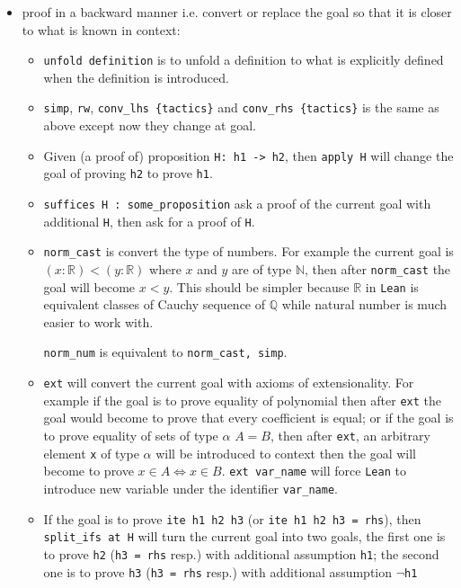 \documentclass{report}
\theoremstyle{definition}
\begin{document}
\begin{itemize}
  \item proof in a backward manner i.e. convert or replace the goal so that it is closer to what is known in context:
  \begin{itemize}
    \item {\tt \small unfold definition} is to unfold a definition to what is explicitly defined when the definition is introduced.
    \item {\tt \small simp}, {\tt \small rw}, {\tt \small conv\_lhs \{tactics\}} and {\tt \small conv\_rhs \{tactics\}} is the same as above except now they change at goal.
    \item Given (a proof of) proposition {\tt \small H: h1 -> h2}, then {\tt \small apply H} will change the goal of proving {\tt \small h2} to prove {\tt \small h1}.
    \item {\tt \small suffices H : some\_proposition} ask a proof of the current goal with additional {\tt \small H}, then ask for a proof of {\tt \small H}.
    \item {\tt \small norm\_cast} is convert the type of numbers. For example the current goal is $(x:\mathbb R)<(y:\mathbb R)$ where $x$ and $y$ are of type $\mathbb N$, then after {\tt \small norm\_cast} the goal will become $x<y$. This should be simpler because $\mathbb R$ in {\tt \small Lean} is equivalent classes of Cauchy sequence of $\mathbb Q$ while natural number is much easier to work with.
    
    {\tt \small norm\_num} is equivalent to {\tt \small norm\_cast, simp}.

    \item {\tt \small ext} will convert the current goal with axioms of extensionality. For example if the goal is to prove equality of polynomial then after {\tt \small ext} the goal would become to prove that every coefficient is equal; or if the goal is to prove equality of sets of type $\alpha$ $A=B$, then after {\tt \small ext}, an arbitrary element {\tt \small x} of type $\alpha$ will be introduced to context then the goal will become to prove $x\in A\iff x\in B$. {\tt \small ext var\_name} will force {\tt \small Lean} to introduce new variable under the identifier {\tt \small var\_name}.
    \item If the goal is to prove {\tt \small ite h1 h2 h3} (or {\tt \small ite h1 h2 h3 = rhs}), then {\tt \small split\_ifs at H} will turn the current goal into two goals, the first one is to prove {\tt \small h2} ({\tt \small h3 = rhs} resp.) with additional assumption {\tt \small h1}; the second one is to prove {\tt \small h3} ({\tt \small h3 = rhs} resp.) with additional assumption {\tt \small $\neg$h1}
  \end{itemize}


\end{itemize}
\end{document}
